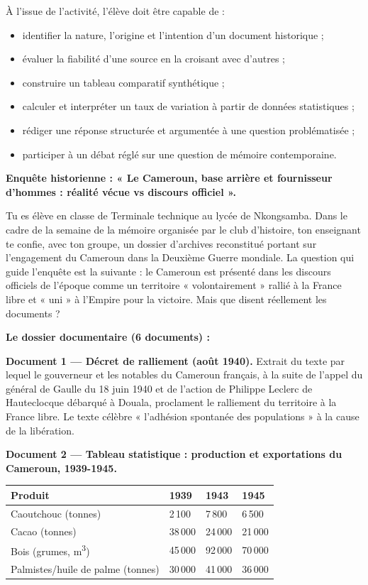 \documentclass[11pt]{article}
\newcounter{popsec}
\newcounter{popsub}
\newcommand{\courssub}[1]{%
  \stepcounter{popsub}%
  \par\vspace{9pt}\noindent{\popxbold\fontsize{11.5}{13}\selectfont\color{popink}{\color{poporange}\thepopsec.\thepopsub}\hspace{6pt}#1}\par\nopagebreak\vspace{4pt}
}
\begin{document}
À l'issue de l'activité, l'élève doit être capable de :
\begin{itemize}
\item identifier la nature, l'origine et l'intention d'un document historique ;
\item évaluer la fiabilité d'une source en la croisant avec d'autres ;
\item construire un tableau comparatif synthétique ;
\item calculer et interpréter un taux de variation à partir de données statistiques ;
\item rédiger une réponse structurée et argumentée à une question problématisée ;
\item participer à un débat réglé sur une question de mémoire contemporaine.
\end{itemize}

\courssub{Situation}

\textbf{Enquête historienne : « Le Cameroun, base arrière et fournisseur d'hommes : réalité vécue vs discours officiel ».}

Tu es élève en classe de Terminale technique au lycée de Nkongsamba. Dans le cadre de la semaine de la mémoire organisée par le club d'histoire, ton enseignant te confie, avec ton groupe, un dossier d'archives reconstitué portant sur l'engagement du Cameroun dans la Deuxième Guerre mondiale. La question qui guide l'enquête est la suivante : le Cameroun est présenté dans les discours officiels de l'époque comme un territoire « volontairement » rallié à la France libre et « uni » à l'Empire pour la victoire. Mais que disent réellement les documents ?

\textbf{Le dossier documentaire (6 documents) :}

\textbf{Document 1 — Décret de ralliement (août 1940).} Extrait du texte par lequel le gouverneur et les notables du Cameroun français, à la suite de l'appel du général de Gaulle du 18 juin 1940 et de l'action de Philippe Leclerc de Hauteclocque débarqué à Douala, proclament le ralliement du territoire à la France libre. Le texte célèbre « l'adhésion spontanée des populations » à la cause de la libération.

\textbf{Document 2 — Tableau statistique : production et exportations du Cameroun, 1939-1945.}

\begin{center}
\begin{tabularx}{\linewidth}{|l|X|X|X|}\hline
\rowcolor{popblueL} \textbf{Produit} & \textbf{1939} & \textbf{1943} & \textbf{1945} \\ \hline
Caoutchouc (tonnes) & 2\,100 & 7\,800 & 6\,500 \\ \hline
Cacao (tonnes) & 38\,000 & 24\,000 & 21\,000 \\ \hline
Bois (grumes, m\textsuperscript{3}) & 45\,000 & 92\,000 & 70\,000 \\ \hline
Palmistes/huile de palme (tonnes) & 30\,000 & 41\,000 & 36\,000 \\ \hline
\end{tabularx}
\end{center}
\end{document}
